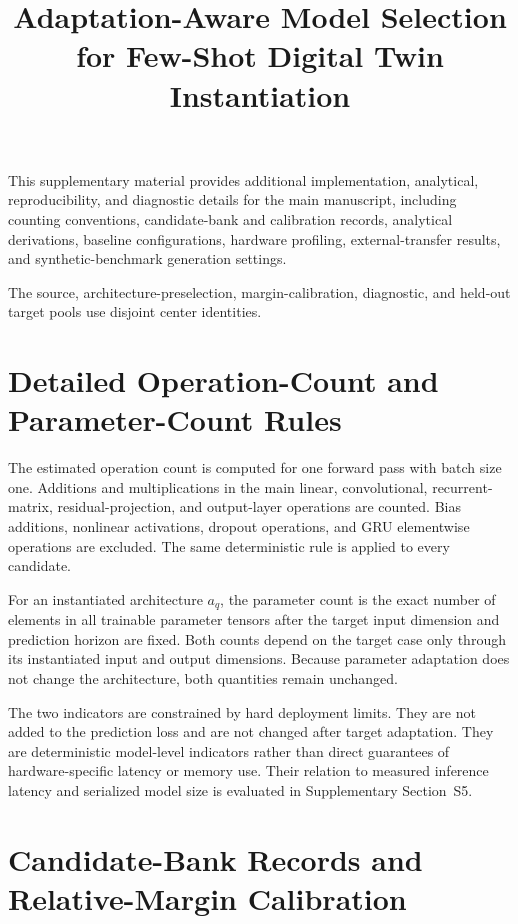 \documentclass[11pt,a4paper]{article}
\title{Adaptation-Aware Model Selection for Few-Shot Digital Twin
Instantiation}
\author{}
\date{}
\begin{document}
\maketitle

This supplementary material provides additional implementation, analytical,
reproducibility, and diagnostic details for the main manuscript, including
counting conventions, candidate-bank and calibration records, analytical
derivations, baseline configurations, hardware profiling, external-transfer
results, and synthetic-benchmark generation settings.

The source, architecture-preselection, margin-calibration, diagnostic, and
held-out target pools use disjoint center identities.

\section{Detailed Operation-Count and Parameter-Count Rules}
\label{supp:counting}

The estimated operation count is computed for one forward pass with batch
size one. Additions and multiplications in the main linear, convolutional,
recurrent-matrix, residual-projection, and output-layer operations are
counted. Bias additions, nonlinear activations, dropout operations, and GRU
elementwise operations are excluded. The same deterministic rule is applied
to every candidate.

For an instantiated architecture $a_q$, the parameter count is the exact
number of elements in all trainable parameter tensors after the target input
dimension and prediction horizon are fixed. Both counts depend on the target
case only through its instantiated input and output dimensions. Because
parameter adaptation does not change the architecture, both quantities remain
unchanged.

The two indicators are constrained by hard deployment limits. They are not
added to the prediction loss and are not changed after target adaptation.
They are deterministic model-level indicators rather than direct guarantees
of hardware-specific latency or memory use.
Their relation to measured inference latency and serialized model size is
evaluated in Supplementary Section~S5.

\section{Candidate-Bank Records and Relative-Margin Calibration}
\label{supp:bank-calibration}
\end{document}
